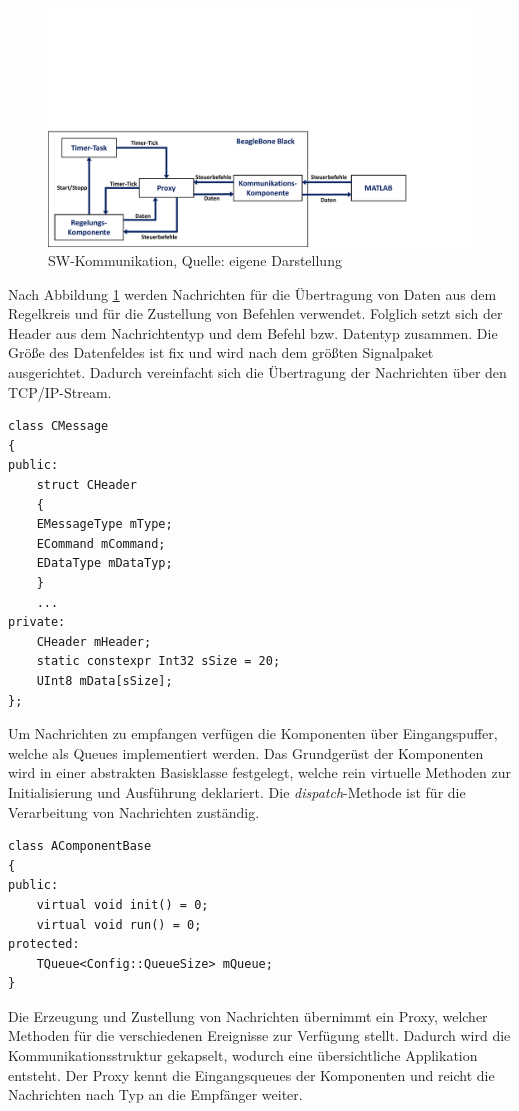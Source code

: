 \begin{figure}[!h]
\centering
\includegraphics[width=0.8\linewidth, trim={0cm 0cm 2cm 9cm},clip]{img/SW_kommunikation}
\caption{SW-Kommunikation, Quelle: eigene Darstellung}
\label{img_kommunikation_sw}
\end{figure}

Nach Abbildung \ref{img_kommunikation_sw} werden Nachrichten für die Übertragung von Daten aus dem Regelkreis und für die Zustellung von Befehlen verwendet. Folglich setzt sich der Header aus dem Nachrichtentyp und dem Befehl bzw. Datentyp zusammen. Die Größe des Datenfeldes ist fix und wird nach dem größten Signalpaket ausgerichtet. Dadurch vereinfacht sich die Übertragung der Nachrichten über den TCP/IP-Stream.

\begin{lstlisting}
class CMessage
{
public:
	struct CHeader
	{
	EMessageType mType;
	ECommand mCommand;
	EDataType mDataTyp;
	}
	...
private:
	CHeader mHeader;
	static constexpr Int32 sSize = 20;
	UInt8 mData[sSize];
};
\end{lstlisting}

Um Nachrichten zu empfangen verfügen die Komponenten über Eingangspuffer, welche als Queues implementiert werden. Das Grundgerüst der Komponenten wird in einer abstrakten Basisklasse festgelegt, welche rein virtuelle Methoden zur Initialisierung und Ausführung deklariert. Die \textit{dispatch}-Methode ist für die Verarbeitung von Nachrichten zuständig.

\begin{lstlisting}
class AComponentBase
{
public:
	virtual void init() = 0;
	virtual void run() = 0;
protected:
	TQueue<Config::QueueSize> mQueue;
}
\end{lstlisting}

Die Erzeugung und Zustellung von Nachrichten übernimmt ein Proxy, welcher Methoden für die verschiedenen Ereignisse zur Verfügung stellt. Dadurch wird die Kommunikationsstruktur gekapselt, wodurch eine übersichtliche Applikation entsteht. Der Proxy kennt die Eingangsqueues der Komponenten und reicht die Nachrichten nach Typ an die Empfänger weiter.

